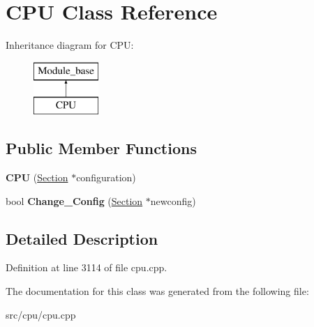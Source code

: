 \hypertarget{classCPU}{\section{C\-P\-U Class Reference}
\label{classCPU}
}
Inheritance diagram for C\-P\-U\-:\begin{figure}[H]
\begin{center}
\leavevmode
\includegraphics[height=2.000000cm]{classCPU}
\end{center}
\end{figure}
\subsection*{Public Member Functions}
\begin{DoxyCompactItemize}
\item 
\hypertarget{classCPU_a7ff8bd1e2634ffa09329984eb00fb890}{{\bfseries C\-P\-U} (\hyperlink{classSection}{Section} $\ast$configuration)}\label{classCPU_a7ff8bd1e2634ffa09329984eb00fb890}

\item 
\hypertarget{classCPU_a84dcaf3dac834731a61c49cacc77f910}{bool {\bfseries Change\-\_\-\-Config} (\hyperlink{classSection}{Section} $\ast$newconfig)}\label{classCPU_a84dcaf3dac834731a61c49cacc77f910}

\end{DoxyCompactItemize}


\subsection{Detailed Description}


Definition at line 3114 of file cpu.\-cpp.



The documentation for this class was generated from the following file\-:\begin{DoxyCompactItemize}
\item 
src/cpu/cpu.\-cpp\end{DoxyCompactItemize}
